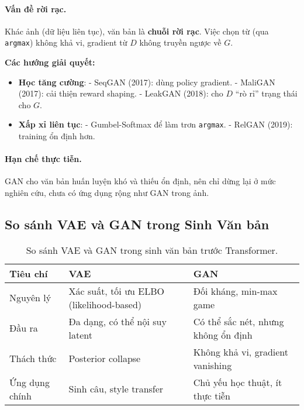\paragraph{Vấn đề rời rạc.}  
Khác ảnh (dữ liệu liên tục), văn bản là \textbf{chuỗi rời rạc}. Việc chọn từ (qua \texttt{argmax}) không khả vi, gradient từ $D$ không truyền ngược về $G$.  

\textbf{Các hướng giải quyết:}
\begin{itemize}
    \item \textbf{Học tăng cường}:  
        - SeqGAN (2017): dùng policy gradient.  
        - MaliGAN (2017): cải thiện reward shaping.  
        - LeakGAN (2018): cho $D$ “rò rỉ” trạng thái cho $G$.  
    \item \textbf{Xấp xỉ liên tục}:  
        - Gumbel-Softmax để làm trơn \texttt{argmax}.  
        - RelGAN (2019): training ổn định hơn.  
\end{itemize}

\paragraph{Hạn chế thực tiễn.}  
GAN cho văn bản huấn luyện khó và thiếu ổn định, nên chỉ dừng lại ở mức nghiên cứu, chưa có ứng dụng rộng như GAN trong ảnh.

\subsection{So sánh VAE và GAN trong Sinh Văn bản}
\label{ssec:vae_gan_compare}

\begin{table}[H]
\centering
\begin{tabular}{|p{3cm}|p{5cm}|p{5cm}|}
\hline
\textbf{Tiêu chí} & \textbf{VAE} & \textbf{GAN} \\ \hline
Nguyên lý & Xác suất, tối ưu ELBO (likelihood-based) & Đối kháng, min-max game \\ \hline
Đầu ra & Đa dạng, có thể nội suy latent & Có thể sắc nét, nhưng không ổn định \\ \hline
Thách thức & Posterior collapse & Không khả vi, gradient vanishing \\ \hline
Ứng dụng chính & Sinh câu, style transfer & Chủ yếu học thuật, ít thực tiễn \\ \hline
\end{tabular}
\caption{So sánh VAE và GAN trong sinh văn bản trước Transformer.}
\label{tab:vae_gan_compare}
\end{table}


